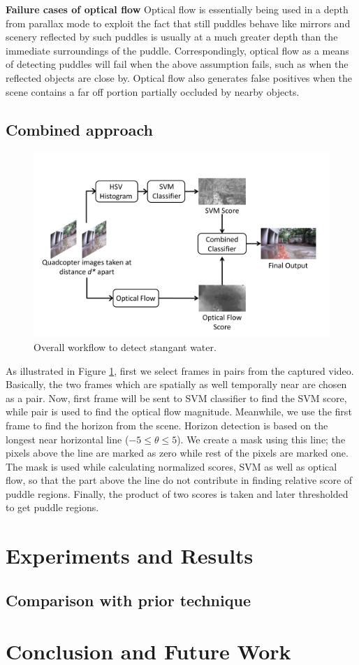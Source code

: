 \documentclass[times,10pt,twocolumn,letterpaper]{article}
\begin{document}
\textbf{Failure cases of optical flow}
Optical flow is essentially being used in a depth from parallax mode to exploit
the fact that still puddles behave like mirrors and scenery reflected by such
puddles is usually at a much greater depth than the immediate surroundings of
the puddle. Correspondingly, optical flow as a means of detecting puddles will
fail when the above assumption fails, such as when the reflected objects are
close by. Optical flow also generates false positives when the scene contains a
far off portion partially occluded by nearby objects.
 

\subsection{Combined approach}
\begin{figure}[h!]
\centering
\includegraphics[width=\linewidth]{images/overall_workflow.pdf}
\caption{Overall workflow to detect stangant water.}
\label{fig:workflow}
\end{figure}

As illustrated in Figure \ref{fig:workflow}, first we select frames in
pairs from the captured video. Basically, the two frames which are
spatially as well temporally near are chosen as a pair.  Now, first frame will
be sent to SVM classifier to find the SVM score, while pair is used to find the
optical flow magnitude. Meanwhile, we use the first frame to find the horizon
from the scene. Horizon detection is  based on the longest near horizontal
line ($-5 \leq \theta \leq 5$). We create a mask using this line; the pixels
above the line are marked as zero while rest of the pixels are marked one. 
The mask is used while calculating normalized scores, SVM as well as optical
flow, so that the part above the line do not contribute in finding relative
score of puddle regions. Finally, the product of two scores is taken and
later thresholded to get puddle regions. 

\section{Experiments and Results}

\subsection{Comparison with prior technique}

\section{Conclusion and Future Work}



\end{document}
